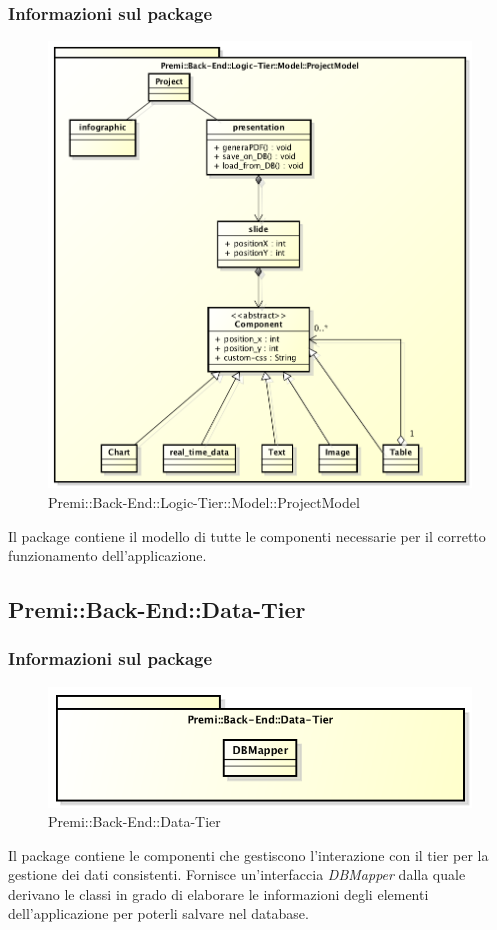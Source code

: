 	\subsubsection{Informazioni sul package}
		\begin{figure}[h]
		\centering
		\includegraphics[width=0.9\linewidth]{img/back-end-logic-tier-model-projectModel}
		\caption[Premi::Back-End::Logic-Tier::Model::ProjectModel]{Premi::Back-End::Logic-Tier::Model::ProjectModel}
	\end{figure}
	Il package contiene il modello di tutte le componenti necessarie per il corretto funzionamento dell'applicazione.


\subsection{Premi::Back-End::Data-Tier}
	\subsubsection{Informazioni sul package}
	\begin{figure}[h]
		\centering
		\includegraphics[width=0.5\linewidth]{img/back-end-package_data-tier}
		\caption[Premi::Back-End::Data-Tier]{Premi::Back-End::Data-Tier}
	\end{figure}
	Il package contiene le componenti che gestiscono l'interazione con il tier per la gestione dei dati consistenti. Fornisce un'interfaccia \textit{DBMapper} dalla quale derivano le classi in grado di elaborare le informazioni degli elementi dell'applicazione per poterli salvare nel database.